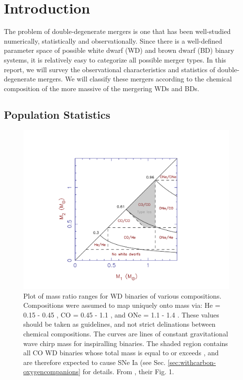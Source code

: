 \section{Introduction}
\label{sec:intro}

The problem of double-degenerate mergers is one that has been well-studied numerically, statistically and observationally.  Since there is a well-defined parameter space of possible white dwarf (WD) and brown dwarf (BD) binary systems, it is relatively easy to categorize all possible merger types.  In this report, we will survey the observational characteristics and statistics of double-degenerate mergers.  We will classify these mergers according to the chemical composition of the more massive of the mergering WDs and BDs.

\subsection{Population Statistics}
\label{ssec:populationstatistics}

\begin{figure}
\centerline{\includegraphics[width=1.1\hsize]{wdbinarymasses.pdf}}
\caption{Plot of mass ratio ranges for WD binaries of various compositions.  Compositions were assumed to map uniquely onto mass via: He = 0.15 - 0.45 {\Msun}, CO = 0.45 - 1.1 {\Msun}, and ONe = 1.1 - 1.4 {\Msun}.  These values should be taken as guidelines, and not strict delinations between chemical compositions.  The curves are lines of constant gravitational wave chirp mass for inspiralling binaries.  The shaded region contains all CO WD binaries whose total mass is equal to or exceeds {\Mchan}, and are therefore expected to cause SNe Ia (see Sec. \ref{sec:withcarbon-oxygencompanions} for details.  From \cite{mars11}, their Fig. 1.}
\label{wdbinarymasses}
\end{figure}


